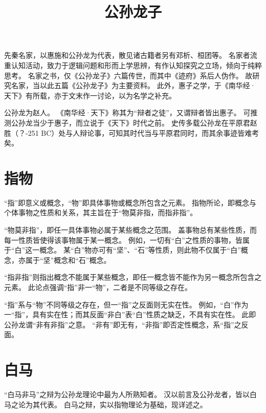 \documentclass[11pt]{article}
\title{公孙龙子}
\date{}
\begin{document}
  \maketitle
  
  \newpage
  \linenumbers

先秦名家，以惠施和公孙龙为代表，散见诸古籍者另有邓析、桓团等。
名家者流重认知活动，致力于逻辑问题和形而上学思辨，有作认知探究之立场，倾向于纯粹思考。
名家之书，仅《公孙龙子》六篇传世，而其中《迹府》系后人伪作。
故研究名家，当以此五篇《公孙龙子》为主要资料。
此外，惠子之学，于《南华经·天下》有所载，亦于文末作一讨论，以为名学之补充。

\newline
公孙龙为赵人。
《南华经·天下》称其为“辩者之徒”，又谓辩者皆出惠子。
可推测公孙龙当少于惠子，而立说于《天下》时代之前。
史传多载公孙龙在平原君赵胜（？-251 BC）处与人辩论事，可知其时代当与平原君同时，而其余事迹皆难考矣。

\section{指物}
“指”即意义或概念，“物”即具体事物或概念所包含之元素。
指物所论，即概念与个体事物之性质和关系，其主旨在于“物莫非指，而指非指”。

\newline

“物莫非指”，即任一具体事物必属于某些概念之范围。
盖事物总有某些性质，而每一性质皆使得该事物属于某一概念。
例如，一切有“白”之性质的事物，皆属于“白”这一概念。
某“白”物亦可有“坚”、“石”等性质，则此物不仅属于“白”概念，亦属于“坚”概念和“石”概念。

\newline

“指非指”则指出概念不能属于某些概念，即任一概念皆不能作为另一概念所包含之元素。
此论点强调“指”非一“物”，二者是不同等级之存在。

\newline

“指”系与“物”不同等级之存在，但一“指”之反面则无实在性。
例如，“白”作为一“指”，具有实在性；而其反面“非白”表“白”性质之缺乏，不具有实在性。
此即公孙龙谓“非有非指”之意。
“非有”即无有，“非指”即否定性概念，系“指”之反面。

\section{白马}
“白马非马”之辩为公孙龙理论中最为人所熟知者。
汉以前言及公孙龙者，皆以白马之论为其代表。
白马之辩，实以指物理论为基础，现详述之。
\end{document}
